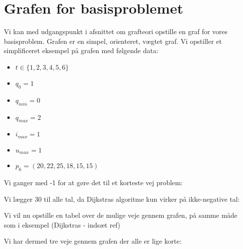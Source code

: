 \section{Grafen for basisproblemet}
Vi kan med udgangspunkt i afsnittet om grafteori opstille en graf for vores basisproblem. Grafen er en simpel, orienteret, vægtet graf. Vi opstiller et simplificeret eksempel på grafen med følgende data:
\begin{itemize}
  \item $t \in \{1,2,3,4,5,6\}$
  \item $q_{0}=1$
  \item $q_{min}=0$
  \item $q_{max}=2$
  \item $i_{max}=1$
  \item $u_{max}=1$
  \item $p_{6}=(20,22,25,18,15,15)$
\end{itemize}



Vi ganger med -1 for at gøre det til et korteste vej problem:



Vi lægger 30 til alle tal, da Dijkstras algoritme kun virker på ikke-negative tal:




Vi vil nu opstille en tabel over de mulige veje gennem grafen, på samme måde som i eksempel (Dijkstras - indsæt ref)



Vi har dermed tre veje gennem grafen der alle er lige korte:

